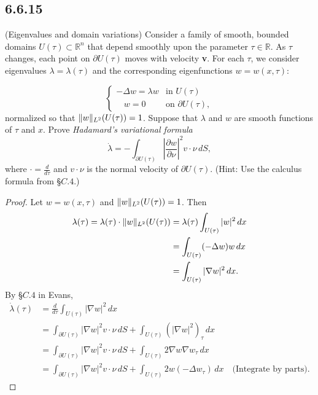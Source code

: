 \documentclass{article}
\DeclarePairedDelimiter{\norm}{\lVert}{\rVert}
\begin{document}
\begin{flushleft}
\subsection{\textbf{6.6.15}} (Eigenvalues and domain variations)  Consider a family of smooth, bounded domains $U(\tau)\subset \mathbb R^n$ that depend smoothly upon the parameter $\tau\in\mathbb R$. As $\tau$ changes, each point on $\partial U(\tau)$ moves with velocity \textbf{v}.
For each $\tau$, we consider eigenvalues $\lambda = \lambda(\tau)$ and the corresponding eigenfunctions $w=w(x,\tau):$

\[
  \begin{cases} 
      -\Delta w=\lambda w & \text{in $U(\tau)$} \\
      ~~~~w=0 & \text{on $\partial U(\tau)$}, 
   \end{cases}
\]
normalized so that $\norm{w}_{L^2}(U(\tau))=1$. Suppose that $\lambda$ and $w$ are smooth functions of $\tau$ and $x$.
Prove \textit{Hadamard's variational formula}
$$\dot{\lambda}=-\int_{\partial U(\tau)}\left|\frac{\partial w}{\partial \nu}\right|^2 v\cdot \nu\,dS,$$
where $\cdot = \frac{d}{d\tau}$ and $v\cdot\nu$ is the normal velocity of $\partial U(\tau)$.
(Hint: Use the calculus formula from §$C.4.$)
\begin{proof}
Let $w=w(x,\tau)$ and $\norm{w}_{L^2}(U(\tau))=1$. Then
\begin{align*}\lambda(\tau)=\lambda(\tau)\cdot \norm{w}_{L^2}(U(\tau))&=\lambda(\tau)\int_{U(\tau)}|w|^2\,dx\\&=
\int_{U(\tau)}(-\Delta w)w\,dx\\&=
\int_{U(\tau)}|\nabla w|^2\,dx.
\end{align*}
By §$C.4$ in Evans,
\begin{align*}
\dot{\lambda}(\tau)&=\frac{d}{d\tau}\int_{U(\tau)}|\nabla w|^2\,dx \\&=
\int_{\partial U(\tau)} |\nabla w|^2 v\cdot \nu\,dS + \int_{U(\tau)} \left(|\nabla w|^2\right)_{\tau}\,dx \\&=
\int_{\partial U(\tau)} |\nabla w|^2 v\cdot \nu\,dS + \int_{U(\tau)} 2\nabla w \nabla w_{\tau} \,dx\\&=
\int_{\partial U(\tau)} |\nabla w|^2 v\cdot \nu\,dS + \int_{U(\tau)} 2w(-\Delta w_{\tau})\,dx \quad\text{(Integrate by parts)}.
\end{align*} 


\end{proof}
\end{flushleft}
\end{document}
